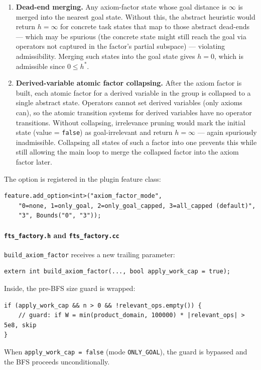 \documentclass[11pt,a4paper]{article}
\begin{document}
\begin{enumerate}
  \item \textbf{Dead-end merging.}  Any axiom-factor state whose goal distance
    is $\infty$ is merged into the nearest goal state.  Without this, the
    abstract heuristic would return $h = \infty$ for concrete task states that
    map to those abstract dead-ends --- which may be spurious (the concrete
    state might still reach the goal via operators not captured in the factor's
    partial subspace) --- violating admissibility.  Merging such states into the
    goal state gives $h = 0$, which is admissible since $0 \le h^*$.

  \item \textbf{Derived-variable atomic factor collapsing.}  After the axiom
    factor is built, each atomic factor for a derived variable in the group is
    collapsed to a single abstract state.  Operators cannot set derived
    variables (only axioms can), so the atomic transition systems for derived
    variables have no operator transitions.  Without collapsing, irrelevance
    pruning would mark the initial state (value = \texttt{false}) as
    goal-irrelevant and return $h = \infty$ --- again spuriously inadmissible.
    Collapsing all states of such a factor into one prevents this while still
    allowing the main loop to merge the collapsed factor into the axiom factor
    later.
\end{enumerate}

The option is registered in the plugin feature class:
\begin{lstlisting}
feature.add_option<int>("axiom_factor_mode",
    "0=none, 1=only_goal, 2=only_goal_capped, 3=all_capped (default)",
    "3", Bounds("0", "3"));
\end{lstlisting}

\paragraph{\texttt{fts\_factory.h} and \texttt{fts\_factory.cc}}

\texttt{build\_axiom\_factor} receives a new trailing parameter:
\begin{lstlisting}
extern int build_axiom_factor(..., bool apply_work_cap = true);
\end{lstlisting}
Inside, the pre-BFS size guard is wrapped:
\begin{lstlisting}
if (apply_work_cap && n > 0 && !relevant_ops.empty()) {
    // guard: if W = min(product_domain, 100000) * |relevant_ops| > 5e8, skip
}
\end{lstlisting}
When \texttt{apply\_work\_cap = false} (mode \texttt{ONLY\_GOAL}), the guard is
bypassed and the BFS proceeds unconditionally.
\end{document}
